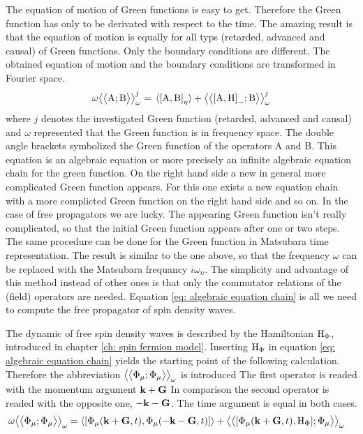 The equation of motion of Green functions is easy to get.
Therefore the Green function has only to be derivated with respect to the time.
The amazing result is that the equation of motion is equally for all typs (retarded, advanced and causal) of Green functions.
Only the boundary conditions are different.
The obtained equation of motion and the boundary conditions are transformed in Fourier space.
%
\begin{align}
	\omega \green{\mt{A}}{\mt{B}}_{\omega}^{j} = \expval*{\comm{\mt{A}}{\mt{B}}_{\eta}} + \green{\comm{\mt{A}}{\mt{H}}_{-}}{\mt{B}}_{\omega}^{j}
	\label{eq: algebraic equation chain}
\end{align}
%
where $j$ denotes the investigated Green function (retarded, advanced and causal) and $\omega$ represented that the Green function is in frequency space.
The double angle brackets symbolized the Green function of the operators A and B.
This equation is an algebraic equation or more precisely an infinite algebraic equation chain for the green function.
On the right hand side a new in general more complicated Green function appears.
For this one exists a new equation chain with a more complicted Green function on the right hand side and so on.
In the case of free propagators we are lucky.
The appearing Green function isn't really complicated, so that the initial Green function appears after one or two steps.
The same procedure can be done for the Green function in Matsubara time representation.
The result is similar to the one above, so that the frequency $\omega$ can be replaced with the Matsubara frequancy $i\omega_{n}$.
The simplicity and advantage of this method instead of other ones is that only the commutator relations of the (field) operators are needed.
Equation \eqref{eq: algebraic equation chain} is all we need to compute the free propagator of spin density waves.

The dynamic of free spin density waves is described by the Hamiltonian $\mathrm{H}_{\Phi}$, introduced in chapter \ref{ch: spin fermion model}.
Inserting $\mathrm{H}_{\Phi}$ in equation \eqref{eq: algebraic equation chain} yields the starting point of the following calculation.
Therefore the abbreviation $\big\langle\big\langle{\Phi_{\mu}};{\Phi_{\mu}}\big\rangle\big\rangle_{\omega}$ is introduced
The first operator is readed with the momentum argument $\vb{k}+\vb{G}$ 
In comparison the second operator is readed with the opposite one, $-\vb{k}-\vb{G}$.
The time argument is equal in both cases.
%
\begin{align}
	\omega \green{\Phi_{\mu}}{\Phi_{\mu}}_{\omega} &= 
		\expval{\comm{\Phi_{\mu}(\vb{k}+\vb{G},t)}{\Phi_{\mu}(-\vb{k}-\vb{G},t)}}
		+
		\green{\comm{\Phi_{\mu}(\vb{k}+\vb{G},t)}{\mt{H}_{\Phi}}}{\Phi_{\mu}}_{\omega}
		\label{eq: equation chain SDW}
\end{align}
%

